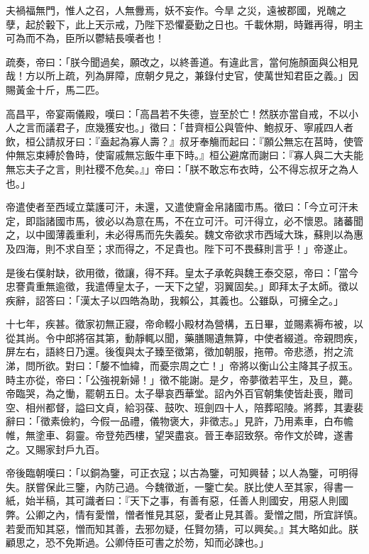 \begin{pinyinscope}
 夫禍福無門，惟人之召，人無釁焉，妖不妄作。今旱之災，遠被郡國，兇醜之孽，起於轂下，此上天示戒，乃陛下恐懼憂勤之日也。千載休期，時難再得，明主可為而不為，臣所以鬱結長嘆者也！



 疏奏，帝曰：「朕今聞過矣，願改之，以終善道。有違此言，當何施顏面與公相見哉！方以所上疏，列為屏障，庶朝夕見之，兼錄付史官，使萬世知君臣之義。」因賜黃金十斤，馬二匹。



 高昌平，帝宴兩儀殿，嘆曰：「高昌若不失德，豈至於亡！然朕亦當自戒，不以小人之言而議君子，庶幾獲安也。」徵曰：「昔齊桓公與管仲、鮑叔牙、寧戚四人者飲，桓公請叔牙曰：『盍起為寡人壽？』叔牙奉觴而起曰：『願公無忘在莒時，使管仲無忘束縛於魯時，使甯戚無忘飯牛車下時。』桓公避席而謝曰：『寡人與二大夫能無忘夫子之言，則社稷不危矣。』」帝曰：「朕不敢忘布衣時，公不得忘叔牙之為人也。」



 帝遣使者至西域立葉護可汗，未還，又遣使齎金帛諸國市馬。徵曰：「今立可汗未定，即詣諸國市馬，彼必以為意在馬，不在立可汗。可汗得立，必不懷恩。諸蕃聞之，以中國薄義重利，未必得馬而先失義矣。魏文帝欲求市西域大珠，蘇則以為惠及四海，則不求自至；求而得之，不足貴也。陛下可不畏蘇則言乎！」帝遂止。



 是後右僕射缺，欲用徵，徵讓，得不拜。皇太子承乾與魏王泰交惡，帝曰：「當今忠謇貴重無逾徵，我遣傅皇太子，一天下之望，羽翼固矣。」即拜太子太師。徵以疾辭，詔答曰：「漢太子以四皓為助，我賴公，其義也。公雖臥，可擁全之。」



 十七年，疾甚。徵家初無正寢，帝命輟小殿材為營構，五日畢，並賜素褥布被，以從其尚。令中郎將宿其第，動靜輒以聞，藥膳賜遺無算，中使者綴道。帝親問疾，屏左右，語終日乃還。後復與太子臻至徵第，徵加朝服，拖帶。帝悲懣，拊之流涕，問所欲。對曰：「嫠不恤緯，而憂宗周之亡！」帝將以衡山公主降其子叔玉。時主亦從，帝曰：「公強視新婦！」徵不能謝。是夕，帝夢徵若平生，及旦，薨。帝臨哭，為之慟，罷朝五日。太子舉哀西華堂。詔內外百官朝集使皆赴喪，贈司空、相州都督，謚曰文貞，給羽葆、鼓吹、班劍四十人，陪葬昭陵。將葬，其妻裴辭曰：「徵素儉約，今假一品禮，儀物褒大，非徵志。」見許，乃用素車，白布幨帷，無塗車、芻靈。帝登苑西樓，望哭盡哀。晉王奉詔致祭。帝作文於碑，遂書之。又賜家封戶九百。



 帝後臨朝嘆曰：「以銅為鑒，可正衣寇；以古為鑒，可知興替；以人為鑒，可明得失。朕嘗保此三鑒，內防己過。今魏徵逝，一鑒亡矣。朕比使人至其家，得書一紙，始半稿，其可識者曰：『天下之事，有善有惡，任善人則國安，用惡人則國弊。公卿之內，情有愛憎，憎者惟見其惡，愛者止見其善。愛憎之間，所宜詳慎。若愛而知其惡，憎而知其善，去邪勿疑，任賢勿猜，可以興矣。』其大略如此。朕顧思之，恐不免斯過。公卿侍臣可書之於笏，知而必諫也。」




\end{pinyinscope}
